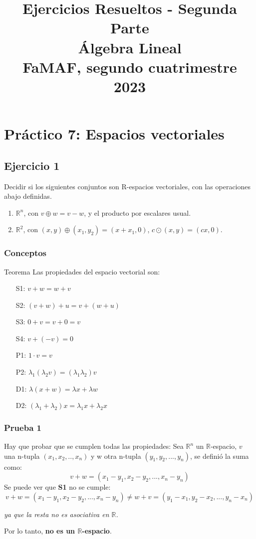 \documentclass[a4paper,12pt]{article}
\author{}
\date{}
\title{\Large \textbf{Ejercicios Resueltos - Segunda Parte} \\ Álgebra Lineal \\ FaMAF, segundo cuatrimestre 2023 }
\begin{document}
\maketitle
\tableofcontents
\newpage
\section{Práctico 7: Espacios vectoriales}
\subsection{Ejercicio 1}
Decidir si los siguientes conjuntos son R-espacios vectoriales, con las operaciones abajo definidas.
\begin{enumerate}
    \item $\mathds{R}^n$, con $v \oplus w= v - w$, y el producto por escalares usual.
    \item $\mathds{R}^2$, con $(x,y)\oplus(x_1,y_2)=(x+x_1,0)$, $c\odot(x,y)=(cx,0)$.
\end{enumerate}
\subsubsection{Conceptos}
\begin{teobox}{Teorema}
    Las propiedades del espacio vectorial son:
 	\begin{itemize}
 		\item[S1:] $v+w=w+v$
 		\item[S2:] $(v+w)+u=v+(w+u)$ 
 		\item[S3:] $0+v=v+0=v$
 		\item[S4:] $v+(-v)=0$
 		\item[P1:] $1\cdot v=v$
 		\item[P2:] $\lambda_1(\lambda_2v)=(\lambda_1\lambda_2)v$
 		\item[D1:] $\lambda(x+w)=\lambda x + \lambda w$
 		\item[D2:] $(\lambda_1+\lambda_2)x=\lambda_1x+\lambda_2x$
 	\end{itemize}
\end{teobox}
\subsubsection{Prueba 1}
Hay que probar que se cumplen todas las propiedades: \newline
Sea $\mathds{R}^n$ un $\mathds{R}$-espacio, $v$ una n-tupla $(x_1,x_2,..,x_n)$ y w otra n-tupla $(y_1,y_2,...,y_n)$, se definió la suma como:
$$v+w=(x_1-y_1,x_2-y_2,...,x_n-y_n)$$
Se puede ver que \textbf{S1} no se cumple:
$$v+w=(x_1-y_1,x_2-y_2,...,x_n-y_n)\neq w+v=(y_1-x_1,y_2-x_2,...,y_n-x_n)$$
\begin{center}
 	\textit{ya que la resta no es asociativa en $\mathds{R}$.}
\end{center}
Por lo tanto, \textbf{no es un $\mathds{R}$-espacio}.
\end{document}
